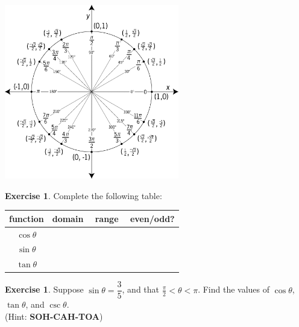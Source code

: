\documentclass[11pt,reqno,final]{amsart}
\numberwithin{equation}{section}
\numberwithin{figure}{section}
\theoremstyle{definition} %
\newtheorem{exercise}[question]{Exercise}
\begin{document}
\begin{minipage}{.5\textwidth}
\begin{center}
        \includegraphics[width=3in]{09-09P_unitcircle.png}
        \qquad
\end{center}
\end{minipage}
\begin{minipage}{.5\textwidth}
        \begin{exercise}
                Complete the following table:
                {\renewcommand{\arraystretch}{3}%
                  \begin{center}
                          \begin{tabular}{c|c|c|c}
                            function & \quad domain \quad $ $& \quad range \quad $ $ & even/odd?\\ \hline
                            $\cos \theta$ &&& \\
                            $\sin \theta$ &&& \\
                            $\tan \theta$ &&& \\ 
                          \end{tabular}
                  \end{center}
                }
        \end{exercise}
\end{minipage}

\begin{exercise}
        Suppose $\sin \theta = \dfrac{3}{5}$, and that $\frac{\pi}{2} < \theta < \pi$.
        Find the values of $\cos \theta$, $\tan \theta$, and $\csc \theta$.\\
        (Hint: \textbf{SOH-CAH-TOA})
        \vfill
\end{exercise}
\end{document}
